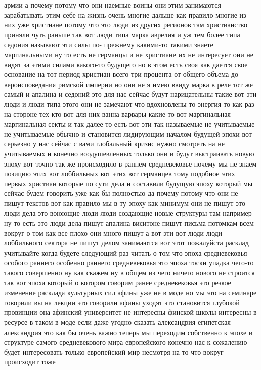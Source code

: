 армии а почему потому что они наемные воины они этим занимаются зарабатывать
этим себе на жизнь очень многие дальше как правило многие из них уже христиане
потому что это люди из других регионов там христианство приняли чуть раньше так
вот люди типа марка аврелия и уж тем более типа седония называют эти силы по-
прежнему какими-то такими знаете маргинальными ну то есть не германцы и не
христиане их не интересует они не видят за этими силами какого-то будущего но в
этом есть своя как дается свое основание на тот период христиан всего три
процента от общего объема до вероисповедания римской империи но они не я имею
ввиду марка в реле тот же самый и апалина и седоний это для нас сейчас будут
нарицательны такие вот эти люди и люди типа этого они не замечают что
вдохновлены то энергия то как раз на стороне тех кто вот для них ванна варвары
какие-то вот маргинальная маргинальная секты и так далее то есть вот эти так
называемые не учитываемые не учитываемые обычно и становится лидирующим началом
будущей эпохи вот серьезно у нас сейчас с вами глобальный кризис нужно смотреть
на не учитываемых и конечно воодушевленных только они и будут выстраивать новую
эпоху вот точно так же происходило в раннем средневековье почему мы не знаем
позицию этих вот лоббильных вот этих вот германцев тому подобное этих первых
христиан которые по сути дела и составили будущую эпоху который мы сейчас будем
говорить уже как бы полностью да почему потому что они не пишут текстов вот как
правило мы в ту эпоху как минимум они не пишут это люди дела это воюющие люди
люди создающие новые структуры там например ну то есть это люди дела пишут
апалина виситоне пишут письма потомкам всем вокруг о том как все плохо они много
пишут а вот эти вот люди люди лоббильного сектора не пишут делом занимаются вот
этот пожалуйста расклад учитывайте когда будете следующий раз читать о том что
эпоха средневековья особого раннего особенно раннего средневековья это эпоха
тоски упадка чего-то такого совершенно ну как скажем ну в общем из чего ничего
нового не строится так вот эпоха который о котором говорим ранее средневековья
это резкое изменение расклада культурных сил афины уже не в моде но мы это на
семинаре говорили вы на лекции это говорили афины уходят это становится глубокой
провинции она афинский университет не интересны финской школы интересны в
ресурсе в таком в моде если даже угодно сказать александрия египетская
александрия это как бы очень важно теперь мы переходим собственно к эпохе и
структуре самого средневекового мира европейского конечно нас к сожалению будет
интересовать только европейский мир несмотря на то что вокруг происходит тоже
